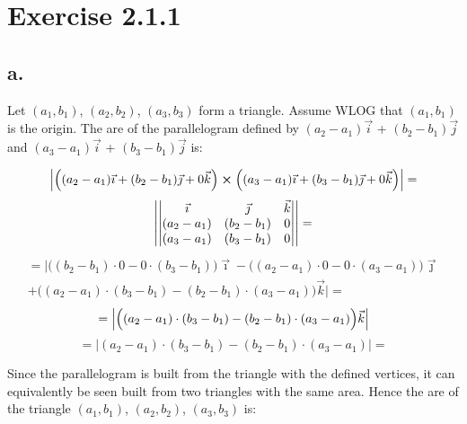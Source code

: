 \documentclass{article}
\begin{document}
\section*{Exercise 2.1.1}

\subsection*{a.}

Let \((a_{1}, b_{1})\), \((a_{2}, b_{2})\), \((a_{3}, b_{3})\) form a triangle. Assume WLOG that \((a_{1}, b_{1})\) is the origin.
The are of the parallelogram defined by \((a_{2} - a_{1})\vec{i}\) + \((b_{2} - b_{1})\vec{j}\) and
\((a_{3} - a_{1})\vec{i}\) + \((b_{3} - b_{1})\vec{j}\) is:

\begin{equation*}
    \Big|\Big((a_{2} - a_{1})\vec{\imath} + (b_{2} - b_{1})\vec{\jmath} + 0\vec{k}\Big) \cross \Big((a_{3} - a_{1})\vec{\imath} + (b_{3} - b_{1})\vec{\jmath} + 0\vec{k}\Big)\Big| =
\end{equation*}
\begin{equation*}
    \abs{
\begin{vmatrix} 
    \vec{\imath} & \vec{\jmath} & \vec{k} \\
    (a_{2} - a_{1}) & (b_{2} - b_{1}) & 0 \\
    (a_{3} - a_{1}) & (b_{3} - b_{1}) & 0
\end{vmatrix}
    }
    =
\end{equation*}
\begin{multline*}
        = \Bigg|\Big( (b_{2} - b_{1}) \cdot 0 - 0 \cdot (b_{3} - b_{1}) \Big)\vec{\imath} - \Big( (a_{2} - a_{1}) \cdot 0 - 0 \cdot (a_{3} - a_{1}) \Big)\vec{\jmath} \\
        + \Big( (a_{2} - a_{1}) \cdot (b_{3} - b_{1}) - (b_{2} - b_{1}) \cdot (a_{3} - a_{1}) \Big)\vec{k}\Bigg| =
\end{multline*}
\begin{equation*}
    = \abs{\Big( (a_{2} - a_{1}) \cdot (b_{3} - b_{1}) - (b_{2} - b_{1}) \cdot (a_{3} - a_{1}) \Big)\vec{k}}
\end{equation*}
\begin{equation*}
    = \Big| (a_{2} - a_{1}) \cdot (b_{3} - b_{1}) - (b_{2} - b_{1}) \cdot (a_{3} - a_{1})\Big| =
\end{equation*}


Since the parallelogram is built from the triangle with the defined vertices, it can equivalently be seen built from two
triangles with the same area. Hence the are of the triangle \((a_{1}, b_{1})\), \((a_{2}, b_{2})\), \((a_{3}, b_{3})\) is:
\end{document}
